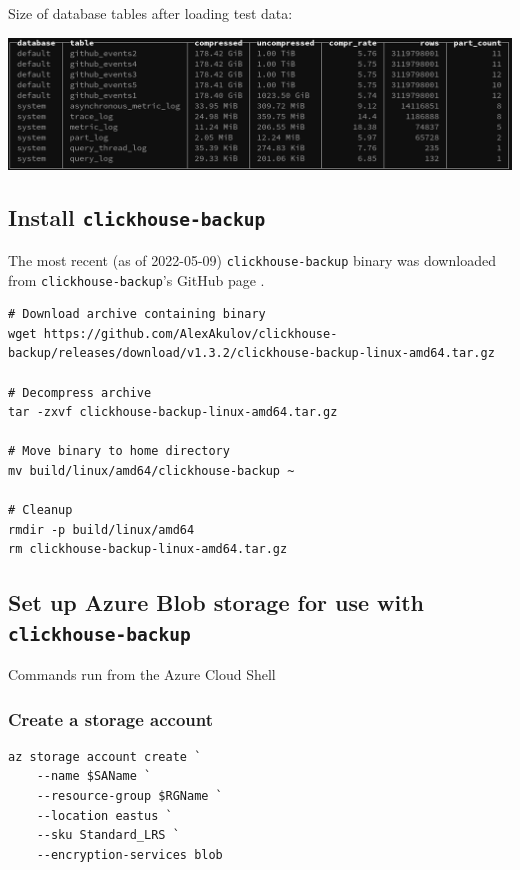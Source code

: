 Size of database tables after loading test data:
\begin{center}
\includegraphics[width=.9\linewidth]{figures/clickhouse/table_sizes.png}
\end{center}
\subsection{Install \texttt{clickhouse-backup}}
\label{sec:org3015272}
The most recent (as of 2022-05-09) \texttt{clickhouse-backup} binary was downloaded
from \texttt{clickhouse-backup}'s GitHub page \cite{akulov_clickhouse-backup_2022}.

\begin{verbatim}
# Download archive containing binary
wget https://github.com/AlexAkulov/clickhouse-backup/releases/download/v1.3.2/clickhouse-backup-linux-amd64.tar.gz

# Decompress archive
tar -zxvf clickhouse-backup-linux-amd64.tar.gz

# Move binary to home directory
mv build/linux/amd64/clickhouse-backup ~

# Cleanup
rmdir -p build/linux/amd64
rm clickhouse-backup-linux-amd64.tar.gz
\end{verbatim}
\subsection{Set up Azure Blob storage for use with \texttt{clickhouse-backup}}
\label{sec:orgf1120ab}
Commands run from the Azure Cloud Shell
\subsubsection{Create a storage account}
\label{sec:org7131bc2}
\begin{verbatim}
az storage account create `
    --name $SAName `
    --resource-group $RGName `
    --location eastus `
    --sku Standard_LRS `
    --encryption-services blob
\end{verbatim}

